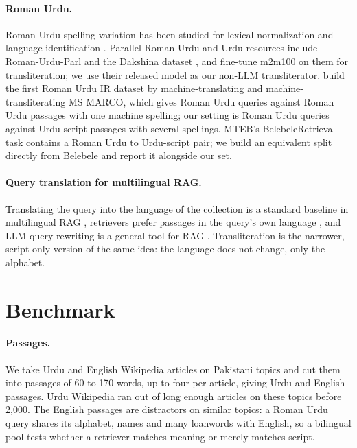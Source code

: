 \documentclass[11pt]{article}
\begin{document}
\paragraph{Roman Urdu.} Roman Urdu spelling variation has been studied for lexical normalization \citep{rafae2015unsupervised,khan2022clustering} and language identification \citep{benton2025informal}. Parallel Roman Urdu and Urdu resources include Roman-Urdu-Parl \citep{alam2022romanurduparl} and the Dakshina dataset \citep{roark2020dakshina}, and \citet{butt2025translit} fine-tune m2m100 on them for transliteration; we use their released model as our non-LLM transliterator. \citet{butt2025romanurduir} build the first Roman Urdu IR dataset by machine-translating and machine-transliterating MS MARCO, which gives Roman Urdu queries against Roman Urdu passages with one machine spelling; our setting is Roman Urdu queries against Urdu-script passages with several spellings. MTEB's BelebeleRetrieval task \citep{muennighoff2023mteb,enevoldsen2025mmteb} contains a Roman Urdu to Urdu-script pair; we build an equivalent split directly from Belebele and report it alongside our set.

\paragraph{Query translation for multilingual RAG.} Translating the query into the language of the collection is a standard baseline in multilingual RAG \citep{chirkova2024mrag,ranaldi2026mrag}, retrievers prefer passages in the query's own language \citep{park2025language}, and LLM query rewriting is a general tool for RAG \citep{ma2023queryrewriting}. Transliteration is the narrower, script-only version of the same idea: the language does not change, only the alphabet.

\section{Benchmark}

\paragraph{Passages.} We take Urdu and English Wikipedia articles on Pakistani topics and cut them into passages of 60 to 170 words, up to four per article, giving \WikiNUrduPassages{} Urdu and \WikiNEnglishPassages{} English passages. Urdu Wikipedia ran out of long enough articles on these topics before 2{,}000. The English passages are distractors on similar topics: a Roman Urdu query shares its alphabet, names and many loanwords with English, so a bilingual pool tests whether a retriever matches meaning or merely matches script.
\end{document}
